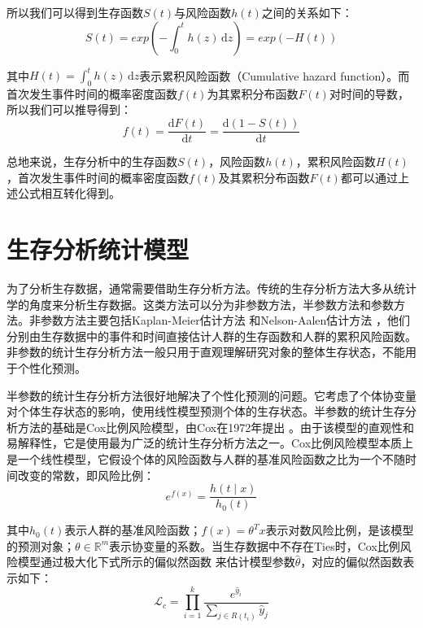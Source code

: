 所以我们可以得到生存函数$S(t)$与风险函数$h(t)$之间的关系如下：
\begin{equation}
S(t)=exp⁡\left(-\int_0^{t} h(z)\,\mathrm{d}z\right)=exp⁡(-H(t)) \label{F2}
\end{equation}

其中$H(t)=\int_0^{t} h(z)\,\mathrm{d}z$表示累积风险函数（Cumulative hazard function）。而首次发生事件时间的概率密度函数$f(t)$为其累积分布函数$F(t)$对时间的导数，所以我们可以推导得到：
\begin{equation}
f(t)=\frac{\mathrm{d}F(t)}{\mathrm{d}t}=\frac{\mathrm{d}(1-S(t))}{\mathrm{d}t} \label{F3}
\end{equation}

总地来说，生存分析中的生存函数$S(t)$，风险函数$h(t)$，累积风险函数$H(t)$，首次发生事件时间的概率密度函数$f(t)$及其累积分布函数$F(t)$都可以通过上述公式相互转化得到。

\section{生存分析统计模型}

为了分析生存数据，通常需要借助生存分析方法。传统的生存分析方法大多从统计学的角度来分析生存数据。这类方法可以分为非参数方法，半参数方法和参数方法。非参数方法主要包括Kaplan-Meier估计方法  和Nelson-Aalen估计方法 ，他们分别由生存数据中的事件和时间直接估计人群的生存函数和人群的累积风险函数。非参数的统计生存分析方法一般只用于直观理解研究对象的整体生存状态，不能用于个性化预测。

半参数的统计生存分析方法很好地解决了个性化预测的问题。它考虑了个体协变量对个体生存状态的影响，使用线性模型预测个体的生存状态。半参数的统计生存分析方法的基础是Cox比例风险模型，由Cox在1972年提出 。由于该模型的直观性和易解释性，它是使用最为广泛的统计生存分析方法之一。Cox比例风险模型本质上是一个线性模型，它假设个体的风险函数与人群的基准风险函数之比为一个不随时间改变的常数，即风险比例：
\begin{equation}
e^{f(x)} =\frac{h(t\mid x)}{h_0 (t)} \label{F4}
\end{equation}

其中$h_0 (t)$表示人群的基准风险函数；$f(x)=\theta^T x$表示对数风险比例，是该模型的预测对象；$\theta \in \mathbb{R}^m$表示协变量的系数。当生存数据中不存在Ties时，Cox比例风险模型通过极大化下式所示的偏似然函数 来估计模型参数$\hat{\theta}$，对应的偏似然函数表示如下：
\begin{equation}
\mathcal{L}_c = \prod_{i=1}^k \frac{e^{\hat{y}_i}}{\sum_{j\in R(t_i)} \hat{y}_j} \label{F5}
\end{equation}

